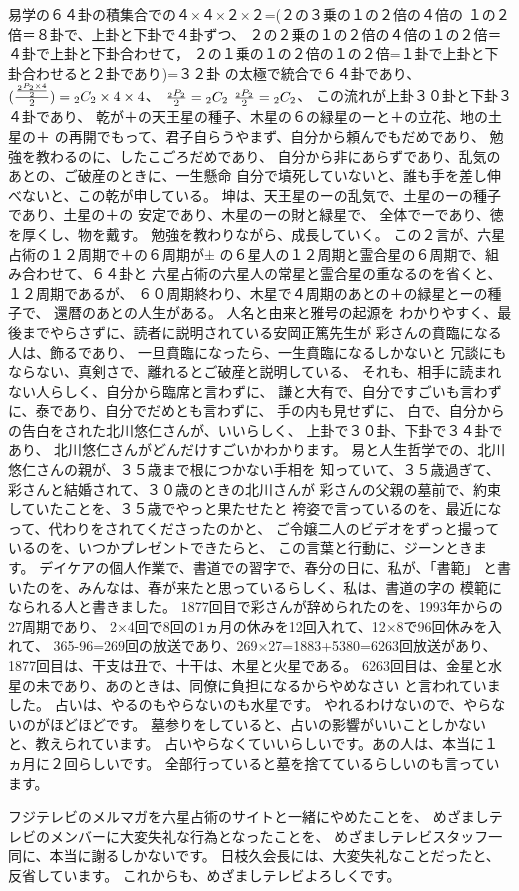 \documentclass{jsarticle}
\begin{document}
\title{}
\author{}
\date{}
\maketitle
 
  易学の６４卦の積集合での４×４×２×２=(２の３乗の１の２倍の４倍の
  １の２倍＝８卦で、上卦と下卦で４卦ずつ、
  ２の２乗の１の２倍の４倍の１の２倍＝４卦で上卦と下卦合わせて，
  ２の１乗の１の２倍の１の２倍=１卦で上卦と下卦合わせると２卦であり)=３２卦
  の太極で統合で６４卦であり、${({{{{{{}_2P_2} \times 4} \over 2}}\over 2})}
  = {}_2C_2 \times 4 \times 4 $、
  $ {{{{}_2P_2} \over 2}} = {}_2C_2 $ $ {{}_2P_2 \over 2}= {}_2C_2 $、
  この流れが上卦３０卦と下卦３４卦であり、
  乾が＋の天王星の種子、木星の６の緑星のーと＋の立花、地の土星の＋
  の再開でもって、君子自らうやまず、自分から頼んでもだめであり、
  勉強を教わるのに、したこごろだめであり、
  自分から非にあらずであり、乱気のあとの、ご破産のときに、一生懸命
  自分で墳死していないと、誰も手を差し伸べないと、この乾が申している。
  坤は、天王星のーの乱気で、土星のーの種子であり、土星の＋の
  安定であり、木星のーの財と緑星で、
  全体でーであり、徳を厚くし、物を戴す。
  勉強を教わりながら、成長していく。
  この２言が、六星占術の１２周期で＋の６周期が±
  の６星人の１２周期と霊合星の６周期で、組み合わせて、６４卦と
  六星占術の六星人の常星と霊合星の重なるのを省くと、１２周期であるが、
  ６０周期終わり、木星で４周期のあとの＋の緑星とーの種子で、
  還暦のあとの人生がある。
  人名と由来と雅号の起源を
  わかりやすく、最後までやらさずに、読者に説明されている安岡正篤先生が
  彩さんの賁臨になる人は、飾るであり、
  一旦賁臨になったら、一生賁臨になるしかないと
  冗談にもならない、真剣さで、離れるとご破産と説明している、
  それも、相手に読まれない人らしく、自分から臨席と言わずに、
  謙と大有で、自分ですごいも言わずに、泰であり、自分でだめとも言わずに、
  手の内も見せずに、
  白で、自分からの告白をされた北川悠仁さんが、いいらしく、
  上卦で３０卦、下卦で３４卦であり、
  北川悠仁さんがどんだけすごいかわかります。
  易と人生哲学での、北川悠仁さんの親が、３５歳まで根につかない手相を
  知っていて、３５歳過ぎて、彩さんと結婚されて、３０歳のときの北川さんが
  彩さんの父親の墓前で、約束していたことを、３５歳でやっと果たせたと
  袴姿で言っているのを、最近になって、代わりをされてくださったのかと、
  ご令嬢二人のビデオをずっと撮っているのを、いつかプレゼントできたらと、
  この言葉と行動に、ジーンときます。
  デイケアの個人作業で、書道での習字で、春分の日に、私が、「書範」
  と書いたのを、みんなは、春が来たと思っているらしく、私は、書道の字の
  模範になられる人と書きました。
  1877回目で彩さんが辞められたのを、1993年からの27周期であり、
  2×4回で8回の1ヵ月の休みを12回入れて、12×8で96回休みを入れて、
  365-96=269回の放送であり、269×27=1883+5380=6263回放送があり、
  1877回目は、干支は丑で、十干は、木星と火星である。
  6263回目は、金星と水星の未であり、あのときは、同僚に負担になるからやめなさい
  と言われていました。
  占いは、やるのもやらないのも水星です。
  やれるわけないので、やらないのがほどほどです。
  墓参りをしていると、占いの影響がいいことしかないと、教えられています。
  占いやらなくていいらしいです。あの人は、本当に１ヵ月に２回らしいです。
  全部行っていると墓を捨てているらしいのも言っています。


     フジテレビのメルマガを六星占術のサイトと一緒にやめたことを、
  めざましテレビのメンバーに大変失礼な行為となったことを、
  めざましテレビスタッフ一同に、本当に謝るしかないです。
  日枝久会長には、大変失礼なことだったと、反省しています。
  これからも、めざましテレビよろしくです。 
\end{document}
